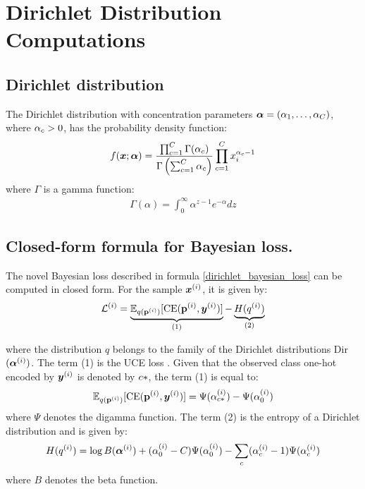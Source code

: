 \section{Dirichlet Distribution Computations}

\subsection{Dirichlet distribution}

The Dirichlet distribution with concentration parameters $\bm \alpha = ( \alpha_1, \dots, \alpha_C )$, where $\alpha_c > 0$, has the probability density function:
\begin{equation}
    f(\bm x; \bm \alpha) =
    \frac{\prod_{c=1}^C \Gamma(\alpha_c)}{\Gamma\left( \sum_{c=1}^C \alpha_c \right)}
    \prod_{c=1}^C x_i^{\alpha_c - 1}
\end{equation}
where $\Gamma$ is a gamma function:
\begin{align*}
    \Gamma(\alpha) = \int_0^\infty \alpha^{z-1} e^{-\alpha} dz
\end{align*}

\subsection{Closed-form formula for Bayesian loss.}

The novel Bayesian loss described in formula \ref{dirichlet_bayesian_loss} can be computed in closed form. For the sample $\bm{x}^{(i)}$, it is given by:
\begin{equation}
       \mathcal{L}^{(i)} = \underbrace{\mathbb{E}_{q(\bold{p}^{(i)})}[\text{CE}(\bold{p}^{(i)}, \bm{y}^{(i)})]}_{\text{(1)}} - \underbrace{H(q^{(i)})}_{\text{(2)}}
\end{equation}

where the distribution $q$ belongs to the family of the Dirichlet distributions Dir$(\bm{\alpha}^{(i)})$. The term (1) is the UCE loss \cite{uceloss}. Given that the observed class one-hot encoded by $\bm{y}^{(i)}$ is denoted by $c*$, the term (1) is equal to:
\begin{equation}
\mathbb{E}_{q(\bold{p}^{(i)})}[\text{CE}(\bold{p}^{(i)}, \bm{y}^{(i)})] = \Psi(\alpha_{c*}^{(i)}) - \Psi(\alpha_0^{(i)})
\end{equation}
where $\Psi$ denotes the digamma function. The term (2) is the entropy of a Dirichlet distribution and is given by:
\begin{equation}
H(q^{(i)}) = \log B(\bm{\alpha}^{(i)}) + (\alpha_0^{(i)} - C) \Psi(\alpha_0^{(i)}) - \sum_c (\alpha_c^{(i)} - 1) \Psi(\alpha_c^{(i)})
\end{equation}
where $B$ denotes the beta function.

